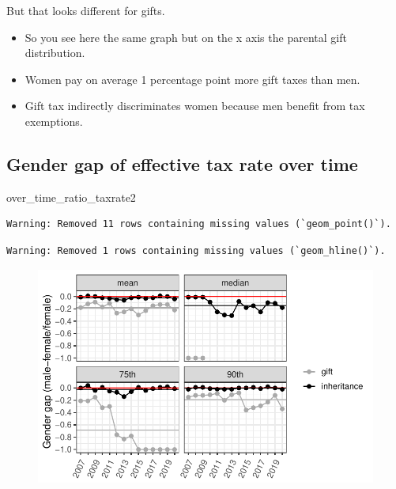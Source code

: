 \documentclass[
  letterpaper,
  DIV=11,
  numbers=noendperiod]{scrartcl}
\newenvironment{Shaded}{\begin{snugshade}}{\end{snugshade}}
\newcommand{\NormalTok}[1]{\textcolor[rgb]{0.00,0.23,0.31}{#1}}
\begin{document}
But that looks different for gifts.

\begin{itemize}
\item
  So you see here the same graph but on the x axis the parental gift
  distribution.
\item
  Women pay on average 1 percentage point more gift taxes than men.
\item
  Gift tax indirectly discriminates women because men benefit from tax
  exemptions.
\end{itemize}

\hypertarget{gender-gap-of-effective-tax-rate-over-time}{%
\subsection{Gender gap of effective tax rate over
time}\label{gender-gap-of-effective-tax-rate-over-time}}

\begin{Shaded}
\begin{Highlighting}[]
\NormalTok{over\_time\_ratio\_taxrate2}
\end{Highlighting}
\end{Shaded}

\begin{verbatim}
Warning: Removed 11 rows containing missing values (`geom_point()`).
\end{verbatim}

\begin{verbatim}
Warning: Removed 1 rows containing missing values (`geom_hline()`).
\end{verbatim}

\begin{figure}[H]

{\centering \includegraphics{dgs_files/figure-pdf/unnamed-chunk-4-1.pdf}

}

\end{figure}
\end{document}
